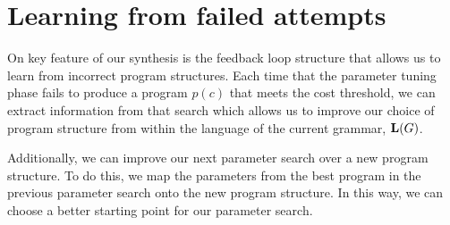 \section{Learning from failed attempts}
\label{sec:feedback}

On key feature of our synthesis is the feedback loop structure that allows us to learn from incorrect program structures.
Each time that the parameter tuning phase fails to produce a program $p(c)$ that meets the cost threshold, we can extract information from that search which allows us to improve our choice of program structure from within the language of the current grammar, $\mathbf{L}(G)$.

Additionally, we can improve our next parameter search over a new program structure.
To do this, we map the parameters from the best program in the previous parameter search onto the new program structure.
In this way, we can choose a better starting point for our parameter search.
